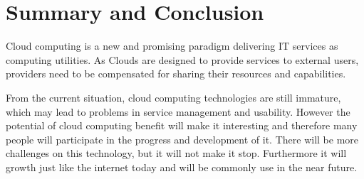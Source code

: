 \documentclass[conference, compsoc]{IEEEtran}
\begin{document}
%







\section{Summary and Conclusion}
Cloud computing is a new and promising paradigm delivering IT services as computing utilities. 
As Clouds are designed to provide services to external users, providers need to be compensated for sharing their resources and capabilities. 

From the current situation, cloud computing technologies are still immature, which may lead to problems in service management and usability. 
However  the potential of cloud computing benefit will make it interesting and therefore many people will participate in the progress and development of it. 
There will be more challenges on this technology, but it will not make it stop. 
Furthermore it will growth just like the internet today and will be commonly use in the near future.
\end{document}
